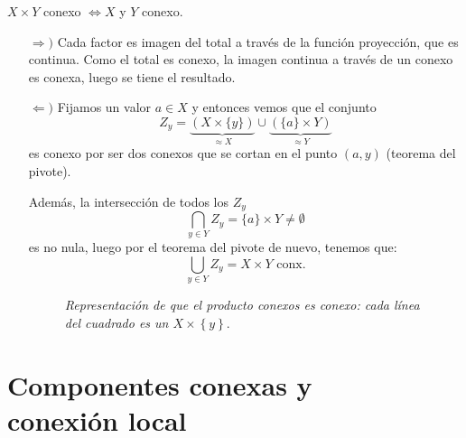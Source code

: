 \begin{prop}
$X \times Y$ conexo $\Leftrightarrow X$ y $Y$ conexo.
\end{prop} 
\begin{demo}
\begin{itemize}
    \item[$\Rightarrow)$] Cada factor es imagen del total a través de la función proyección, que es continua. Como el total es conexo, la imagen continua a través de un conexo es conexa, luego se tiene el resultado.

    \item[$\Leftarrow)$] Fijamos un valor $a \in X$ y entonces vemos que el conjunto
    \[
    Z_y = \underbrace{\left( X \times \{y\} \right)}_{\approx X}\cup \underbrace{\left( \{a\} \times Y \right)}_{\approx Y}
    \]
    es conexo por ser dos conexos que se cortan en el punto $\left( a, y \right)$ (teorema del pivote).
    
    Además, la intersección de todos los $Z_y$
    \[
    \bigcap_{y \in Y} Z_y = \{a\} \times Y \neq \emptyset
    \]
    es no nula, luego por el teorema del pivote de nuevo, tenemos que:
    \[
    \bigcup_{y \in Y} Z_y = X \times Y \text{ conx.}
    \]
    \begin{figure}[H]
        \centering
        \caption{\textit{Representación de que el producto conexos es conexo: cada línea del cuadrado es un $X \times \left\{ y \right\}.$}}
    \end{figure}
\end{itemize}
\end{demo}


\chapter{Componentes conexas y\texorpdfstring{\\}{} conexión local}%
\label{cha:componentes_conexas_y_conexion_local}
